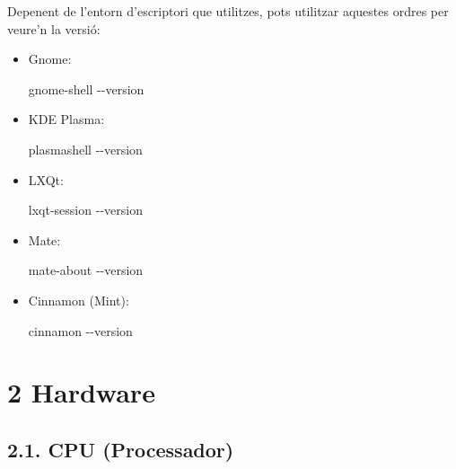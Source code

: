 \documentclass[
  a4paper,
]{article}
\newenvironment{Shaded}{\begin{snugshade}}{\end{snugshade}}
\newcommand{\AttributeTok}[1]{\textcolor[rgb]{0.13,0.29,0.53}{#1}}
\newcommand{\ExtensionTok}[1]{#1}
\begin{document}
Depenent de l'entorn d'escriptori que utilitzes, pots utilitzar aquestes
ordres per veure'n la versió:

\begin{itemize}
\item
  Gnome:

\begin{Shaded}
\begin{Highlighting}[]
\ExtensionTok{gnome{-}shell} \AttributeTok{{-}{-}version}
\end{Highlighting}
\end{Shaded}
\item
  KDE Plasma:

\begin{Shaded}
\begin{Highlighting}[]
\ExtensionTok{plasmashell} \AttributeTok{{-}{-}version}
\end{Highlighting}
\end{Shaded}
\item
  LXQt:

\begin{Shaded}
\begin{Highlighting}[]
\ExtensionTok{lxqt{-}session} \AttributeTok{{-}{-}version}
\end{Highlighting}
\end{Shaded}
\item
  Mate:

\begin{Shaded}
\begin{Highlighting}[]
\ExtensionTok{mate{-}about} \AttributeTok{{-}{-}version}
\end{Highlighting}
\end{Shaded}
\item
  Cinnamon (Mint):

\begin{Shaded}
\begin{Highlighting}[]
\ExtensionTok{cinnamon} \AttributeTok{{-}{-}version}
\end{Highlighting}
\end{Shaded}
\end{itemize}

\section{2 Hardware}\label{hardware}

\subsection{2.1. CPU (Processador)}\label{cpu-processador}
\end{document}
